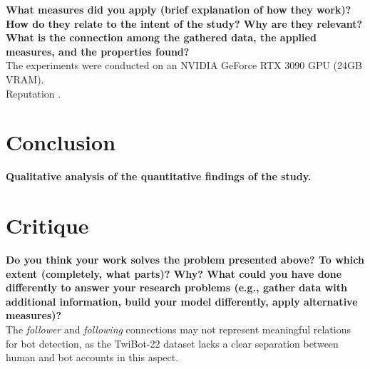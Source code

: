 \documentclass[12pt, a4paper]{article}
\begin{document}
\textbf{What measures did you apply (brief explanation of how they work)? How do
they relate to the intent of the study? Why are they relevant? What is the connection among the gathered data, the applied measures,
and the properties found?}\\

The experiments were conducted on an NVIDIA GeForce RTX 3090 GPU (24GB VRAM).\\

Reputation \cite{Beskow2020FriendBot}.


\section{Conclusion}
\label{conclusion}

\textbf{Qualitative analysis of the quantitative findings of the study.}


\section{Critique}
\label{critique}

\textbf{Do you think your work solves the problem presented above? To which
extent (completely, what parts)? Why? What could you have done
differently to answer your research problems (e.g., gather data with
additional information, build your model differently, apply alternative
measures)?}\\

The \textit{follower} and \textit{following} connections may not represent meaningful relations for bot detection, as the TwiBot-22 dataset lacks a clear separation between human and bot accounts in this aspect.




\end{document}

